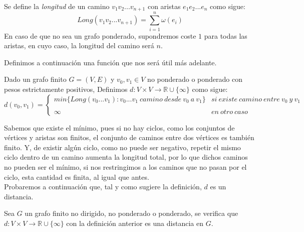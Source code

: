 \begin{definicion}
	Se define la \textit{longitud} de un camino $v_1v_2...v_{n+1}$ con aristas $e_1e_2...e_n$ como sigue: 
	$$Long(v_1v_2...v_{n+1}) = \sum_{i=1}^{n}\omega(e_i)$$
	En caso de que no sea un grafo ponderado, supondremos coste $1$ para todas las aristas, en cuyo caso, la longitud del camino será $n$.
\end{definicion}

Definimos a continuación una función que nos será útil más adelante.

\begin{definicion}\label{def:dist}
	Dado un grafo finito $G=(V,E)$ y $v_0,v_1\in V$ no ponderado o ponderado con pesos estrictamente positivos, Definimos $d:V\times V \rightarrow \mathbb{R}\cup \{\infty\}$ como sigue:
	$$d(v_0,v_1)= \left\{ \begin{array}{lcc}
		min\{Long(v_0...v_1) : v_0...v_1\ camino\ desde\ v_0\ a\ v_1\} &   si\ existe\ camino\ entre\ v_0\ y\ v_1 \\
		\\ \infty &  en\ otro\ caso
	\end{array}
	\right.$$
\end{definicion}

Sabemos que existe el mínimo, pues si no hay ciclos, como los conjuntos de vértices y aristas son finitos, el conjunto de caminos entre dos vértices es también finito. Y, de existir algún ciclo, como no puede ser negativo, repetir el mismo ciclo dentro de un camino aumenta la longitud total, por lo que dichos caminos no pueden ser el mínimo, si nos restringimos a los caminos que no pasan por el ciclo, esta cantidad es finita, al igual que antes. \\

Probaremos a continuación que, tal y como sugiere la definición, $d$ es un distancia.

\begin{proposicion}\label{prop:distancia}
	Sea $G$ un grafo finito no dirigido, no ponderado o ponderado, se verifica que $d:V\times V \rightarrow \mathbb{R}\cup \{\infty\}$ con la definición anterior es una distancia en $G$.
\end{proposicion}


